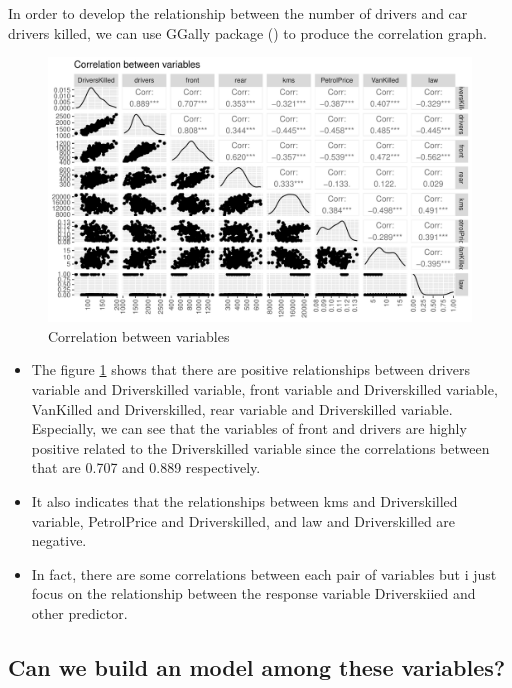 \documentclass[11pt,a4paper,]{article}
\begin{document}
In order to develop the relationship between the number of drivers and car drivers killed, we can use GGally package (\cite{10}) to produce the correlation graph.

\begin{figure}[H]

{\centering \includegraphics{report_files/figure-latex/myggpair-1} 

}

\caption{Correlation between variables}\label{fig:myggpair}
\end{figure}

\begin{itemize}
\item
  The figure \ref{fig:myggpair} shows that there are positive relationships between drivers variable and Driverskilled variable, front variable and Driverskilled variable, VanKilled and Driverskilled, rear variable and Driverskilled variable. Especially, we can see that the variables of front and drivers are highly positive related to the Driverskilled variable since the correlations between that are 0.707 and 0.889 respectively.
\item
  It also indicates that the relationships between kms and Driverskilled variable, PetrolPrice and Driverskilled, and law and Driverskilled are negative.
\item
  In fact, there are some correlations between each pair of variables but i just focus on the relationship between the response variable Driverskiied and other predictor.
\end{itemize}

\hypertarget{can-we-build-an-model-among-these-variables}{%
\subsection{Can we build an model among these variables?}\label{can-we-build-an-model-among-these-variables}}
\end{document}
